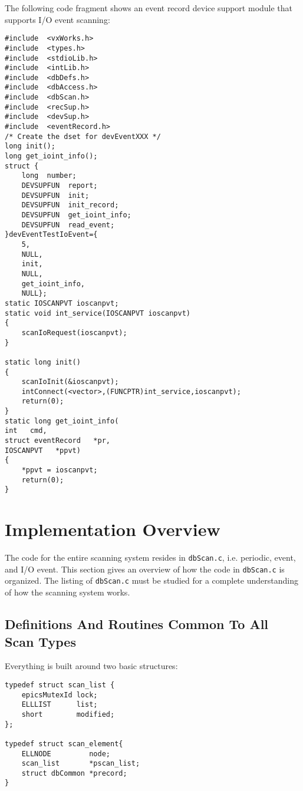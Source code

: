 The following code fragment shows an event record device support module that supports I/O event scanning: 

\begin{verbatim}
#include  <vxWorks.h>
#include  <types.h>
#include  <stdioLib.h>
#include  <intLib.h>
#include  <dbDefs.h>
#include  <dbAccess.h>
#include  <dbScan.h>
#include  <recSup.h>
#include  <devSup.h>
#include  <eventRecord.h>
/* Create the dset for devEventXXX */
long init();
long get_ioint_info();
struct {
    long  number;
    DEVSUPFUN  report;
    DEVSUPFUN  init;
    DEVSUPFUN  init_record;
    DEVSUPFUN  get_ioint_info;
    DEVSUPFUN  read_event;
}devEventTestIoEvent={
    5,
    NULL,
    init,
    NULL,
    get_ioint_info,
    NULL};
static IOSCANPVT ioscanpvt;
static void int_service(IOSCANPVT ioscanpvt)
{
    scanIoRequest(ioscanpvt);
}

static long init()
{
    scanIoInit(&ioscanpvt);
    intConnect(<vector>,(FUNCPTR)int_service,ioscanpvt);
    return(0);
}
static long get_ioint_info(
int   cmd,
struct eventRecord   *pr,
IOSCANPVT   *ppvt)
{
    *ppvt = ioscanpvt;
    return(0);
}
\end{verbatim}

\section{Implementation Overview}

The code for the entire scanning system resides in \verb|dbScan.c|, i.e. periodic, event, and I/O event.
This section gives an overview of how the code in \verb|dbScan.c| is organized.
The listing of \verb|dbScan.c| must be studied for a complete understanding of how the scanning system works.

\subsection{Definitions And Routines Common To All Scan Types}

Everything is built around two basic structures:

\begin{verbatim}
typedef struct scan_list {
    epicsMutexId lock;
    ELLLIST      list;
    short        modified;
};

typedef struct scan_element{
    ELLNODE         node;
    scan_list       *pscan_list;
    struct dbCommon *precord;
}
\end{verbatim}

